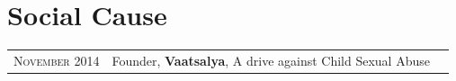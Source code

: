 \documentclass[a4paper,10pt]{article}
\begin{document}
\section{Social Cause}


 \begin{tabular}{rll}
 \textsc{November} 2014 & Founder, \textbf{Vaatsalya}, A drive against Child Sexual Abuse\\
\end{tabular}



\newpage
\end{document}
